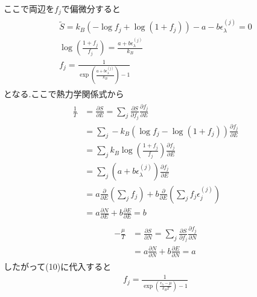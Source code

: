 \documentclass[uplatex,a4j,11pt,dvipdfmx]{jsarticle}
\begin{document}
ここで両辺を$f_j$で偏微分すると
\begin{align}
  \begin{split}
    \tilde{S}=k_B\left(-\log f_j+\log(1+f_j)\right)-a-b\epsilon_\lambda^{(j)}=0\\
    \log\left(\frac{1+f_j}{f_j}\right)=\frac{a+b\epsilon_\lambda^{(j)}}{k_B}\\
    f_j=\frac{1}{\exp\left(\frac{a+b\epsilon_\lambda^{(j)}}{k_B}\right)-1}
  \end{split}
\end{align}
となる.ここで熱力学関係式から
\begin{align}
  \begin{split}
    \frac{1}{T}&=\frac{\partial S}{\partial E}=\sum_j\frac{\partial S}{\partial f_j}\frac{\partial f_j}{\partial E}\\
    &=\sum_j-k_B(\log f_j-\log(1+f_j))\frac{\partial f_j}{\partial E}\\
    &=\sum_jk_B\log\left(\frac{1+f_j}{f_j}\right)\frac{\partial f_j}{\partial E}\\
    &=\sum_j(a+b\epsilon_\lambda^{(j)})\frac{\partial f_j}{\partial E}\\
    &=a\frac{\partial}{\partial E}\left(\sum_jf_j\right)+b\frac{\partial}{\partial E}\left(\sum_jf_j\epsilon_j^{(j)}\right)\\
    &=a\frac{\partial N}{\partial E}+b\frac{\partial E}{\partial E}=b
  \end{split}
\end{align}
\clearpage
\begin{align}
  \begin{split}
    -\frac{\mu}{T}&=\frac{\partial S}{\partial N}=\sum_j\frac{\partial S}{\partial f_j}\frac{\partial f_j}{\partial N}\\
    &=a\frac{\partial N}{\partial N}+b\frac{\partial E}{\partial N}=a
  \end{split}
\end{align}
したがって(10)に代入すると
\begin{align}
  f_j=\frac{1}{\exp\left(\frac{\epsilon_\lambda-\mu}{k_BT}\right)-1}
\end{align}
\end{document}
